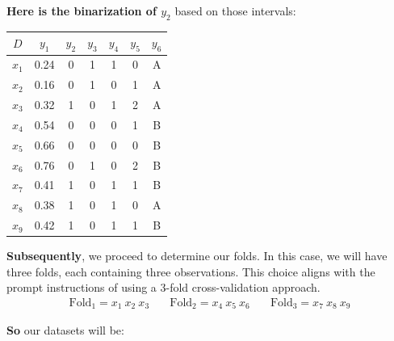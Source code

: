 \documentclass[12pt]{article}
\begin{document}
\begin{enumerate}[leftmargin=\labelsep]
\begin{enumerate}
          \textbf{Here is the binarization of $y_2$} based on those intervals:
          \begin{center}
            \begin{tabular}{c|cccccc}
                \(D\) & \(y_1\) & \(y_2\) & \(y_3\) & \(y_4\) & \(y_5\) & \(y_6\)\\
                \hline
                \(x_1\) & 0.24 & 0 & 1 & 1 & 0 & A  \\
                \(x_2\) & 0.16 & 0 & 1 & 0 & 1 & A  \\
                \(x_3\) & 0.32 & 1 & 0 & 1 & 2 & A  \\
                \(x_4\) & 0.54 & 0 & 0 & 0 & 1 & B  \\
                \(x_5\) & 0.66 & 0 & 0 & 0 & 0 & B  \\
                \(x_6\) & 0.76 & 0 & 1 & 0 & 2 & B  \\
                \(x_7\) & 0.41 & 1 & 0 & 1 & 1 & B  \\
                \(x_8\) & 0.38 & 1 & 0 & 1 & 0 & A  \\
                \(x_9\) & 0.42 & 1 & 0 & 1 & 1 & B  \\
            \end{tabular}
          \end{center}

          \textbf{Subsequently}, we proceed to determine our folds. In this case, we will have three folds, each containing three observations.
          This choice aligns with the prompt instructions of using a 3-fold cross-validation approach.
          \[
              \begin{array}{ccc}
                  \text{Fold}_1 = x_1 \medspace x_2 \medspace x_3 &\quad
                  \text{Fold}_2 = x_4 \medspace x_5 \medspace x_6 &\quad
                  \text{Fold}_3 = x_7 \medspace x_8 \medspace x_9
              \end{array}
          \]

          \textbf{So} our datasets will be:

          \begin{table}[H]
            \centering


\end{table}
\end{enumerate}
\end{enumerate}
\end{document}
